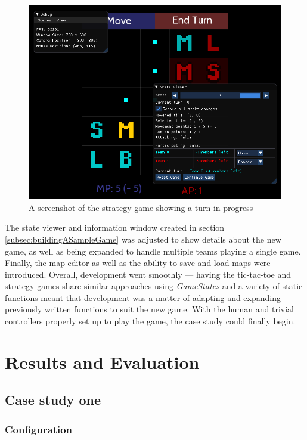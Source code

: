 \documentclass[11pt, a4paper]{report}
\begin{document}
\begin{figure}[!h]
  \centering
  \includegraphics[width=\linewidth]{img/strategy_game.png}
  \caption{A screenshot of the strategy game showing a turn in progress}
  \label{fig:strategyGame}
\end{figure}

The state viewer and information window created in section \ref{subsec:buildingASampleGame} was adjusted to show details about the new game, as well as being expanded to handle multiple teams playing a single game. Finally, the map editor as well as the ability to save and load maps were introduced. Overall, development went smoothly --- having the tic-tac-toe and strategy games share similar approaches using \emph{GameStates} and a variety of static functions meant that development was a matter of adapting and expanding previously written functions to suit the new game. With the human and trivial controllers properly set up to play the game, the case study could finally begin.

\section{Results and Evaluation}
\label{sec:resultsAndEvaluation}

\subsection{Case study one}
\label{subsec:caseStudyOne}

\subsubsection{Configuration}
\end{document}
